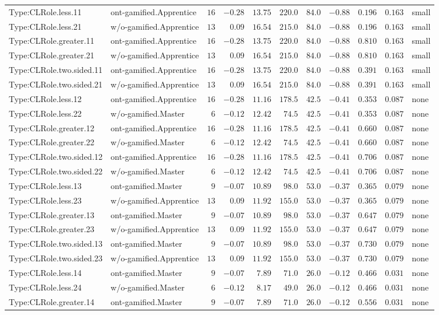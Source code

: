 \documentclass[6pt,a4paper]{article}
\begin{document}
{\begin{longtable}{llrrrrrrrrl}
Type:CLRole.less.11&ont-gamified.Apprentice&$16$&$-0.28$&$13.75$&$220.0$&$ 84.0$&$-0.88$&$0.196$&$0.163$&small\tabularnewline
Type:CLRole.less.21&w/o-gamified.Apprentice&$13$&$ 0.09$&$16.54$&$215.0$&$ 84.0$&$-0.88$&$0.196$&$0.163$&small\tabularnewline
Type:CLRole.greater.11&ont-gamified.Apprentice&$16$&$-0.28$&$13.75$&$220.0$&$ 84.0$&$-0.88$&$0.810$&$0.163$&small\tabularnewline
Type:CLRole.greater.21&w/o-gamified.Apprentice&$13$&$ 0.09$&$16.54$&$215.0$&$ 84.0$&$-0.88$&$0.810$&$0.163$&small\tabularnewline
Type:CLRole.two.sided.11&ont-gamified.Apprentice&$16$&$-0.28$&$13.75$&$220.0$&$ 84.0$&$-0.88$&$0.391$&$0.163$&small\tabularnewline
Type:CLRole.two.sided.21&w/o-gamified.Apprentice&$13$&$ 0.09$&$16.54$&$215.0$&$ 84.0$&$-0.88$&$0.391$&$0.163$&small\tabularnewline
Type:CLRole.less.12&ont-gamified.Apprentice&$16$&$-0.28$&$11.16$&$178.5$&$ 42.5$&$-0.41$&$0.353$&$0.087$&none\tabularnewline
Type:CLRole.less.22&w/o-gamified.Master&$ 6$&$-0.12$&$12.42$&$ 74.5$&$ 42.5$&$-0.41$&$0.353$&$0.087$&none\tabularnewline
Type:CLRole.greater.12&ont-gamified.Apprentice&$16$&$-0.28$&$11.16$&$178.5$&$ 42.5$&$-0.41$&$0.660$&$0.087$&none\tabularnewline
Type:CLRole.greater.22&w/o-gamified.Master&$ 6$&$-0.12$&$12.42$&$ 74.5$&$ 42.5$&$-0.41$&$0.660$&$0.087$&none\tabularnewline
Type:CLRole.two.sided.12&ont-gamified.Apprentice&$16$&$-0.28$&$11.16$&$178.5$&$ 42.5$&$-0.41$&$0.706$&$0.087$&none\tabularnewline
Type:CLRole.two.sided.22&w/o-gamified.Master&$ 6$&$-0.12$&$12.42$&$ 74.5$&$ 42.5$&$-0.41$&$0.706$&$0.087$&none\tabularnewline
Type:CLRole.less.13&ont-gamified.Master&$ 9$&$-0.07$&$10.89$&$ 98.0$&$ 53.0$&$-0.37$&$0.365$&$0.079$&none\tabularnewline
Type:CLRole.less.23&w/o-gamified.Apprentice&$13$&$ 0.09$&$11.92$&$155.0$&$ 53.0$&$-0.37$&$0.365$&$0.079$&none\tabularnewline
Type:CLRole.greater.13&ont-gamified.Master&$ 9$&$-0.07$&$10.89$&$ 98.0$&$ 53.0$&$-0.37$&$0.647$&$0.079$&none\tabularnewline
Type:CLRole.greater.23&w/o-gamified.Apprentice&$13$&$ 0.09$&$11.92$&$155.0$&$ 53.0$&$-0.37$&$0.647$&$0.079$&none\tabularnewline
Type:CLRole.two.sided.13&ont-gamified.Master&$ 9$&$-0.07$&$10.89$&$ 98.0$&$ 53.0$&$-0.37$&$0.730$&$0.079$&none\tabularnewline
Type:CLRole.two.sided.23&w/o-gamified.Apprentice&$13$&$ 0.09$&$11.92$&$155.0$&$ 53.0$&$-0.37$&$0.730$&$0.079$&none\tabularnewline
Type:CLRole.less.14&ont-gamified.Master&$ 9$&$-0.07$&$ 7.89$&$ 71.0$&$ 26.0$&$-0.12$&$0.466$&$0.031$&none\tabularnewline
Type:CLRole.less.24&w/o-gamified.Master&$ 6$&$-0.12$&$ 8.17$&$ 49.0$&$ 26.0$&$-0.12$&$0.466$&$0.031$&none\tabularnewline
Type:CLRole.greater.14&ont-gamified.Master&$ 9$&$-0.07$&$ 7.89$&$ 71.0$&$ 26.0$&$-0.12$&$0.556$&$0.031$&none\tabularnewline

\end{longtable}}
\end{document}
